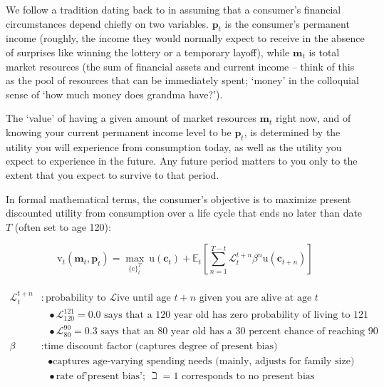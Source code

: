 \documentclass{article}
\newcommand{\uFunc}{\mathrm{u}}
\newcommand{\pLvl}{\mathbf{p}}
\newcommand{\mLvl}{\mathbf{m}}
\newcommand{\DiscFac}{\beta}
\newcommand{\cFunc}{\mathrm{c}}
\newcommand{\vFunc}{\mathrm{v}}
\newcommand{\Alive}{\mathcal{L}}
\newcommand{\cLvl}{\mathbf{c}}
\newcommand{\Ex}{\mathbb{E}}
\begin{document}
We follow a tradition dating back to \cite{friedman1957} in assuming that a consumer's financial circumstances depend chiefly on two variables. $\pLvl_{t}$ is the consumer's permanent income (roughly, the income they would normally expect to receive in the absence of surprises like winning the lottery or a temporary layoff), while $\mLvl_{t}$ is total market resources (the sum of financial assets and current income -- think of this as the pool of resources that can be immediately spent; `money' in the colloquial sense of `how much money does grandma have?').

The `value' of having a given amount of market resources $\mLvl_{t}$ right now, and of knowing your current permanent income level to be $\pLvl_{t}$, is determined by the utility you will experience from consumption today, as well as the utility you expect to experience in the future. Any future period matters to you only to the extent that you expect to survive to that period.

In formal mathematical terms, the consumer's objective is to maximize present discounted utility from consumption over a life cycle that ends no later than date $T$ (often set to age 120):

\begin{equation}
\label{eq:lifecyclemax}
\pmb{\vFunc}_{t}(\mLvl_{t},\pLvl_{t}) = \max_{\{\cFunc\}_{t}^{T}} ~ \uFunc(\cLvl_{t})+\Ex_{t}\left[\sum_{n=1}^{T-t} \Alive_{t}^{t+n}{\DiscFac}^{n} \uFunc(\cLvl_{t+n}) \right]
\end{equation}

\begin{align}
    \\ \Alive _{t}^{t+n} & : \text{probability to }\Alive\text{ive until age $t+n$ given you are alive at age $t$}
    \\                   & {~~~}\bullet \text{$\Alive_{120}^{121} = 0.0$ says that a 120 year old has zero probability of living to 121}
    \\                   & {~~~}\bullet \text{$\Alive_{80}^{90} = 0.3$ says that an 80 year old has a 30 percent chance of reaching 90}
    \\ {\DiscFac}        & : \text{time discount factor (captures degree of present bias)}
    \\                   & {~~~} \bullet \text{captures age-varying spending needs (mainly, adjusts for family size)}
    \\                   & {~~~} \bullet \text{rate of'present bias'; $\beth=1$ corresponds to no present bias}
\end{align}
\end{document}
